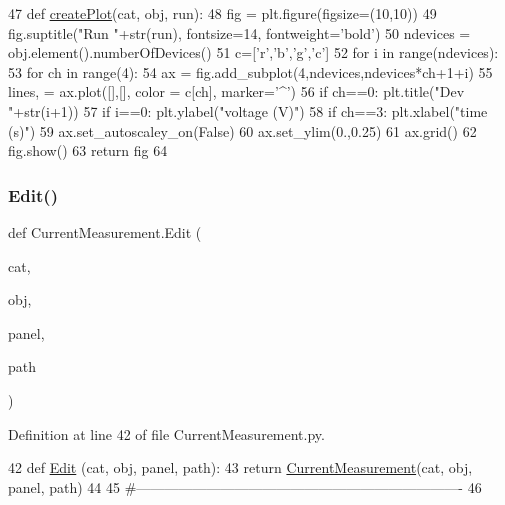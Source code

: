 \begin{DoxyCode}
47 \textcolor{keyword}{def }\hyperlink{namespaceCurrentMeasurement_abb4e5049746f99263fabbdb1e62b35df}{createPlot}(cat, obj, run):
48     fig = plt.figure(figsize=(10,10))
49     fig.suptitle(\textcolor{stringliteral}{"Run "}+str(run), fontsize=14, fontweight=\textcolor{stringliteral}{'bold'})
50     ndevices = obj.element().numberOfDevices()
51     c=[\textcolor{stringliteral}{'r','}b','g','c']
52     \textcolor{keywordflow}{for} i \textcolor{keywordflow}{in} range(ndevices):
53         \textcolor{keywordflow}{for} ch \textcolor{keywordflow}{in} range(4):
54             ax = fig.add\_subplot(4,ndevices,ndevices*ch+1+i)
55             lines, = ax.plot([],[], color = c[ch], marker=\textcolor{stringliteral}{'^'})
56             \textcolor{keywordflow}{if} ch==0: plt.title(\textcolor{stringliteral}{"Dev "}+str(i+1))
57             \textcolor{keywordflow}{if} i==0: plt.ylabel(\textcolor{stringliteral}{"voltage (V)"})
58             \textcolor{keywordflow}{if} ch==3: plt.xlabel(\textcolor{stringliteral}{"time (s)"})
59             ax.set\_autoscaley\_on(\textcolor{keyword}{False})
60             ax.set\_ylim(0.,0.25)
61             ax.grid()        
62     fig.show()    
63     \textcolor{keywordflow}{return} fig
64 
\end{DoxyCode}
\mbox{\label{namespaceCurrentMeasurement_a7057dd96433e4643ae9a6d3b924378a0}} 
\subsubsection{\texorpdfstring{Edit()}{Edit()}}
{\footnotesize\ttfamily def Current\+Measurement.\+Edit (\begin{DoxyParamCaption}\item[{}]{cat,  }\item[{}]{obj,  }\item[{}]{panel,  }\item[{}]{path }\end{DoxyParamCaption})}



Definition at line 42 of file Current\+Measurement.\+py.


\begin{DoxyCode}
42 \textcolor{keyword}{def }\hyperlink{namespaceCurrentMeasurement_a7057dd96433e4643ae9a6d3b924378a0}{Edit} (cat, obj, panel, path):
43     \textcolor{keywordflow}{return} \hyperlink{classCurrentMeasurement}{CurrentMeasurement}(cat, obj, panel, path)
44 
45 \textcolor{comment}{#----------------------------------------------------------------------}
46 
\end{DoxyCode}
\mbox{\label{namespaceCurrentMeasurement_a7de64b4b34fccae5633afcb56d04363f}} 
